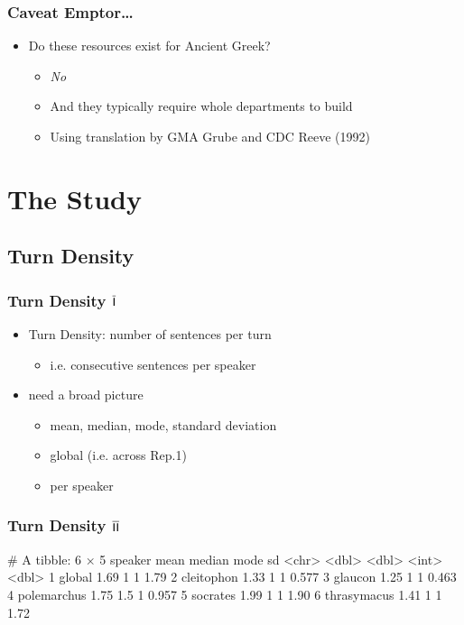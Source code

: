 \documentclass{beamer}
\renewcommand{\Roman}[1]{$\overline{\textsf{\small{\MakeUppercase{\romannumeral #1}}}}$}
\begin{document}
\begin{frame}
\frametitle{Caveat Emptor\dots}
\begin{itemize}
\item Do these resources exist for Ancient Greek?
  \begin{itemize}
    \item \textit{No}
    \item And they typically require whole departments to build
    \item Using translation by GMA Grube and CDC Reeve (1992)
  \end{itemize}
\end{itemize}
\end{frame}



\section{The Study} %

\subsection{Turn Density}  %


\begin{frame}
\frametitle{Turn Density \Roman{1}}
\begin{itemize}
\item Turn Density: number of sentences per turn
  \begin{itemize}
  \item i.e. consecutive sentences per speaker
  \end{itemize}
\item need a broad picture
  \begin{itemize}
  \item mean, median, mode, standard deviation
  \item global (i.e. across Rep.1)
  \item per speaker
  \end{itemize}
\end{itemize}
\end{frame}



\begin{frame}[fragile]
\frametitle{Turn Density \Roman{2}}
\begin{Schunk}
\begin{Soutput}
# A tibble: 6 × 5
  speaker      mean median  mode    sd
  <chr>       <dbl>  <dbl> <int> <dbl>
1 global       1.69    1       1 1.79 
2 cleitophon   1.33    1       1 0.577
3 glaucon      1.25    1       1 0.463
4 polemarchus  1.75    1.5     1 0.957
5 socrates     1.99    1       1 1.90 
6 thrasymacus  1.41    1       1 1.72 
\end{Soutput}
\end{Schunk}
\end{frame}
\end{document}
